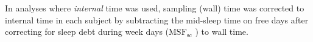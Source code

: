 In analyses where \textit{internal} time was used, sampling (wall) time was corrected to internal time in each subject by subtracting the mid-sleep time on free days after correcting for sleep debt during week days ($\textrm{MSF}_\textrm{sc}$ \cite{Vetter2021}) to wall time. %

